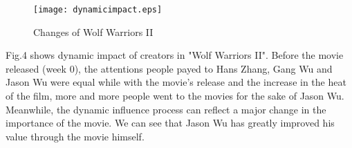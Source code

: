 \begin{figure}[!htbp]
\centering
\texttt{[image: dynamicimpact.eps]}
\caption{Changes of Wolf Warriors II}
\label{fig:mhin}
\end{figure}

\par Fig.4 shows dynamic impact of creators in "Wolf Warriors II". Before the movie released (week 0), the attentions people payed to Hans Zhang, Gang Wu and Jason Wu were equal while with the movie's release and the increase in the heat of the film, more and more people went to the movies for the sake of Jason Wu. Meanwhile, the dynamic influence process can reflect a major change in the importance of the movie. We can see that Jason Wu has greatly improved his value through the movie himself.